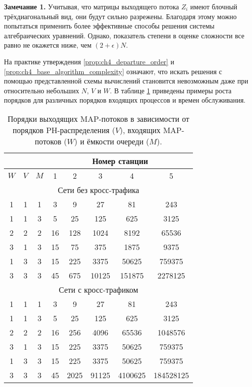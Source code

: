 \textbf{Замечание 1.} Учитывая, что матрицы выходящего потока $Z_i$ имеют блочный трёхдиагональный вид, они будут сильно разрежены. Благодаря этому можно попытаться применить более эффективные способы решения системы алгебраических уравнений. Однако, показатель степени в оценке сложности все равно не окажется ниже, чем $(2 + \epsilon) N$.


На практике утверждения \ref{prop:ch4_departure_order} и \ref{prop:ch4_base_algorithm_complexity} означают, что искать решения с помощью представленной схемы вычислений становится невозможным даже при относительно небольших $N$, $V$ и $W$. В таблице \ref{table:ch4_map_order_growth} приведены примеры роста порядков для различных порядков входящих процессов и времен обслуживания.

\begin{table}[h!]
\centering
\begin{tabular}{ |c|c|c||c|c|c|c|c| }
\hline
\multicolumn{3}{|c||}{} & \multicolumn{5}{c|}{Номер станции} \\
\hline
$W$ & $V$ & $M$ & 1 & 2 & 3 & 4 & 5\\
\hline
\multicolumn{8}{|c|}{Сети без кросс-трафика} \\
\hline
1 & 1 & 1 & 3 & 9 & 27 & 81 & 243 \\
1 & 1 & 3 & 5 & 25 & 125 & 625 & 3125 \\
2 & 2 & 2 & 16 & 128 & 1024 & 8192 & 65536 \\
3 & 1 & 3 & 15 & 75 & 375 & 1875 & 9375 \\
1 & 3 & 3 & 15 & 225 & 3375 & 50625 & 759375 \\
3 & 3 & 3 & 45 & 675 & 10125 & 151875 & 2278125 \\
\hline
\multicolumn{8}{|c|}{Сети с кросс-трафиком} \\
\hline
1 & 1 & 1 & 3 & 9 & 27 & 81 & 243 \\
1 & 1 & 3 & 5 & 25 & 125 & 625 & 3125 \\
2 & 2 & 2 & 16 & 256 & 4096 & 65536 & 1048576 \\
3 & 1 & 3 & 15 & 225 & 3375 & 50625 & 759375 \\
1 & 3 & 3 & 15 & 225 & 3375 & 50625 & 759375 \\
3 & 3 & 3 & 45 & 2025 & 91125 & 4100625 & 184528125 \\
\hline
\end{tabular}
\caption{Порядки выходящих MAP-потоков в зависимости от порядков PH-распределения ($V$), входящих MAP-потоков ($W$) и ёмкости очереди ($M$).\label{table:ch4_map_order_growth}
}
\end{table}

